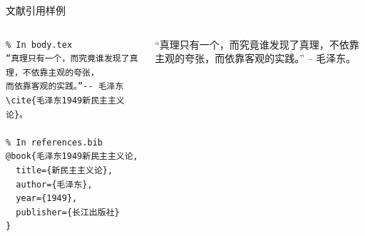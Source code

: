 \begin{frame}[fragile]{文献引用样例}
  \begin{columns}
    \begin{column}{.6\textwidth} 
      \begin{verbatim}
% In body.tex
“真理只有一个，而究竟谁发现了真理，不依靠主观的夸张，
而依靠客观的实践。”-- 毛泽东\cite{毛泽东1949新民主主义论}。

% In references.bib
@book{毛泽东1949新民主主义论,
  title={新民主主义论},
  author={毛泽东},
  year={1949},
  publisher={长江出版社}
}
      \end{verbatim}
    \end{column}
    \begin{column}{.4\textwidth}
      “真理只有一个，而究竟谁发现了真理，不依靠主观的夸张，而依靠客观的实践。” -- 毛泽东\cite{毛泽东1949新民主主义论}。

      \printbibliography[heading=none]
    \end{column}
    \end{columns}
\end{frame}
